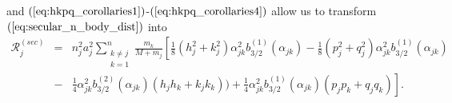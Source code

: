 \documentclass [12pt, a4paper] {article}
\begin{document}
and $(\ref{eq:hkpq_corollaries1})$-$(\ref{eq:hkpq_corollaries4})$
allow us to transform $(\ref{eq:secular_n_body_dist})$ into 
\begin {eqnarray}
    \label{eq:secular_n_body_dist2}
    \mathcal{R}_j^{(sec)}
    &=& 
    n_j^2a_j^2
    \sum_{\substack{k\neq j\\k=1}}^n 
    \frac{m_k}{M + m_j}
    \left[
        \frac{1}{8}(h_j^2 + k_j^2)\alpha_{jk}^2 b_{3/2}^{(1)}(\alpha_{jk})
        -
        \frac{1}{8}(p_j^2 + q_j^2)\alpha_{jk}^2 b_{3/2}^{(1)}(\alpha_{jk})
    \right.
    \\\nonumber
    &-&
    \left.
        \frac{1}{4}\alpha_{jk}^2b_{3/2}^{(2)}(\alpha_{jk})(h_jh_k + k_jk_k))
        +
        \frac{1}{4}\alpha_{jk}^2b_{3/2}^{(1)}(\alpha_{jk})(p_jp_k + q_jq_k)
    \right].
\end {eqnarray}
\end{document}
